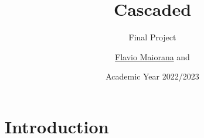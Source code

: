 \documentclass{beamer}
\title{Cascaded}
\subtitle{Final Project}
\author{\href{mailto:maiorana.2051396@studenti.uniroma1.it}{Flavio Maiorana} and }
\date{Academic Year 2022/2023}
\begin{document}
\maketitle

\section{Introduction}

\backmatter
\end{document}
